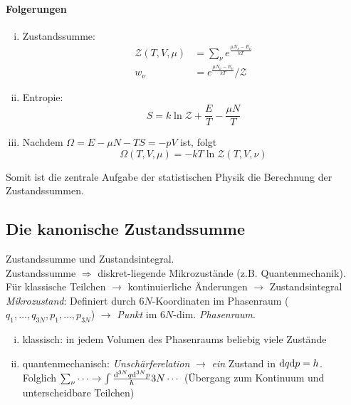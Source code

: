 \paragraph{Folgerungen}
\begin{enumerate}[i)]
    \item Zustandssumme:
    \begin{equation}
        \begin{split}
            \mathcal{Z}(T, V, \mu) &= \sum_\nu e^{\frac{\mu N_\nu - E_\nu}{k T}} \\
            w_\nu &= e^{\frac{\mu N_\nu - E_\nu}{k T}} / \mathcal{Z}
        \end{split}
    \end{equation}
    \item Entropie:
    \begin{equation}
        S = k \ln \mathcal{Z} + \frac{E}{T} - \frac{\mu N}{T}
    \end{equation}
    \item Nachdem $\Omega = E - \mu N - T S = - p V$ ist, folgt
    \begin{equation}
        \Omega(T, V, \mu) = - k T \ln \mathcal{Z}(T, V, \nu)
    \end{equation}
\end{enumerate}
Somit ist die zentrale Aufgabe der statistischen Physik die Berechnung der Zustands\-summen.

\subsection{Die kanonische Zustandssumme}
\label{sub:sum_canon}
Zustandssumme und Zustandsintegral. \\
Zustandssumme $\Rightarrow$ diskret-liegende Mikrozustände (z.B. Quantenmechanik). \\
Für klassische Teilchen $\rightarrow$ kontinuierliche Änderungen $\rightarrow$ Zustandsintegral \\
\emph{Mikrozustand}: Definiert durch $6N$-Koordinaten im Phasenraum ($q_1, \ldots, q_{3N}, p_1, \ldots, p_{3N}$) $\rightarrow$ \emph{Punkt} im
$6N$-dim. \emph{Phasenraum}.
\begin{enumerate}[i)]
    \item klassisch: in jedem Volumen des Phasenraums beliebig viele Zustände
    \item quantenmechanisch: \emph{Unschärferelation} $\rightarrow$ \emph{ein} Zustand in $\mathrm{d} q \mathrm{d} p = h$. \\
    Folglich $\sum_\nu \cdots \rightarrow \int \frac{\mathrm{d}^{3N} q \mathrm{d}^{3N} p}{h} {3N} \cdots$ (Übergang zum Kontinuum und unterscheidbare Teilchen)
\end{enumerate}
